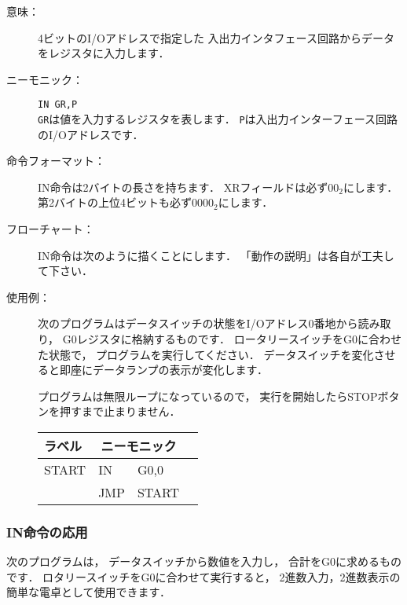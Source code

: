 \begin{description}
\item[意味：]4ビットのI/Oアドレスで指定した
  入出力インタフェース回路からデータをレジスタに入力します．

\item[ニーモニック：]\texttt{IN  GR,P} \\
  \texttt{GR}は値を入力するレジスタを表します．
  \texttt{P}は入出力インターフェース回路のI/Oアドレスです．

\item[命令フォーマット：]IN命令は2バイトの長さを持ちます．
  XRフィールドは必ず$00_2$にします．
  第2バイトの上位4ビットも必ず$0000_2$にします．


\item[フローチャート：]IN命令は次のように描くことにします．
  「動作の説明」は各自が工夫して下さい．

  \begin{center}
  \end{center}

\item[使用例：]
  次のプログラムはデータスイッチの状態をI/Oアドレス0番地から読み取り，
  G0レジスタに格納するものです．
  ロータリースイッチをG0に合わせた状態で，
  プログラムを実行してください．
  データスイッチを変化させると即座にデータランプの表示が変化します．

  プログラムは無限ループになっているので，
  実行を開始したらSTOPボタンを押すまで止まりません．

  {\ttfamily\small\begin{center}
    \begin{tabular}{|l|l l|l}
      \cline{1-3}
      ラベル & \multicolumn{2}{|c|}{ニーモニック} \\
      \hline
      START & IN   & G0,0    \\
      & JMP  & START   \\ 
      \hline
    \end{tabular}
  \end{center}}

\end{description}

\subsubsection{IN命令の応用}
次のプログラムは，
データスイッチから数値を入力し，
合計をG0に求めるものです．
ロタリースイッチをG0に合わせて実行すると，
2進数入力，2進数表示の簡単な電卓として使用できます．

